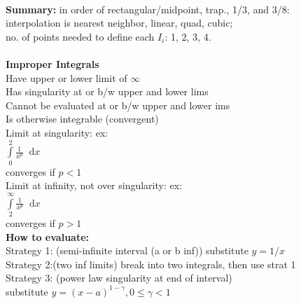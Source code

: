 \documentclass[10pt]{article}
\newcommand*\diff{\mathop{}\!\mathrm{d}}
\begin{document}
{	\\\textbf{Summary:} in order of rectangular/midpoint, trap., 1/3, and 3/8:
	\\interpolation is nearest neighbor, linear, quad, cubic; 
	\\no. of points needed to define each $I_i$: 1, 2, 3, 4.
	\\
	\\\textbf{Improper Integrals}
	\\Have upper or lower limit of $\infty$
	\\Has singularity at or b/w upper and lower lims
	\\Cannot be evaluated at or b/w upper and lower ims
	\\Is otherwise integrable (convergent)
	\\Limit at singularity: ex:
	\\$\int\limits_0^2\frac{1}{x^p}\diff x$
	\\converges if $p<1$
	\\Limit at infinity, not over singularity: ex:
	\\$\int\limits_2^\infty\frac{1}{x^p}\diff x$
	\\converges if $p>1$
	\\\textbf{How to evaluate:}
	\\Strategy 1: (semi-infinite interval (a or b inf)) substitute $y=1/x$
	\\Strategy 2:(two inf limits) break into two integrals, then use strat 1
	\\Strategy 3: (power law singularity at end of interval) 
	\\substitute $y=(x-a)^{1-\gamma}, 0\leq\gamma<1$
	\\
	
	


}
\end{document}
